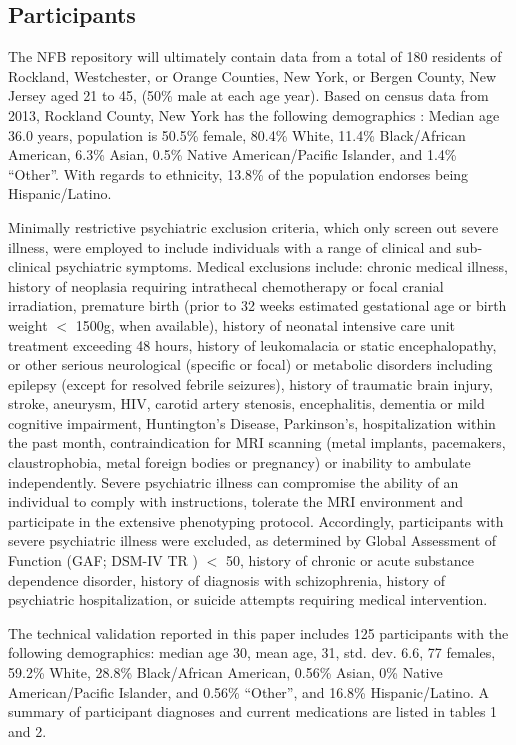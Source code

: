 \subsection{Participants}
The NFB repository will ultimately contain data from a total of 180 residents of Rockland, Westchester, or Orange Counties, New York, or Bergen County, New Jersey aged 21 to 45, (50\% male at each age year). Based on census data from 2013, Rockland County, New York has the following demographics \cite{Census2016}: Median age 36.0 years, population is 50.5\% female, 80.4\% White, 11.4\% Black/African American, 6.3\% Asian, 0.5\% Native American/Pacific Islander, and 1.4\% “Other”. With regards to ethnicity, 13.8\% of the population endorses being Hispanic/Latino.

Minimally restrictive psychiatric exclusion criteria, which only screen out severe illness, were employed to include individuals with a range of clinical and sub-clinical psychiatric symptoms. Medical exclusions include: chronic medical illness, history of neoplasia requiring intrathecal chemotherapy or focal cranial irradiation, premature birth (prior to 32 weeks estimated gestational age or birth weight $<$ 1500g, when available), history of neonatal intensive care unit treatment exceeding 48 hours, history of leukomalacia or static encephalopathy, or other serious neurological (specific or focal) or metabolic disorders including epilepsy (except for resolved febrile seizures), history of traumatic brain injury, stroke, aneurysm, HIV, carotid artery stenosis, encephalitis, dementia or mild cognitive impairment, Huntington’s Disease, Parkinson’s, hospitalization within the past month, contraindication for MRI scanning (metal implants, pacemakers, claustrophobia, metal foreign bodies or pregnancy) or inability to ambulate independently. Severe psychiatric illness can compromise the ability of an individual to comply with instructions, tolerate the MRI environment and participate in the extensive phenotyping protocol. Accordingly, participants with severe psychiatric illness were excluded, as determined by Global Assessment of Function (GAF; DSM-IV TR \cite{First2002}) $<$ 50, history of chronic or acute substance dependence disorder, history of diagnosis with schizophrenia, history of psychiatric hospitalization, or suicide attempts requiring medical intervention.

The technical validation reported in this paper includes 125 participants with the following demographics: median age 30, mean age, 31, std. dev. 6.6, 77 females, 59.2\% White, 28.8\% Black/African American, 0.56\% Asian, 0\% Native American/Pacific Islander, and 0.56\% “Other”, and 16.8\% Hispanic/Latino. A summary of participant diagnoses and current medications are listed in tables 1 and 2.

